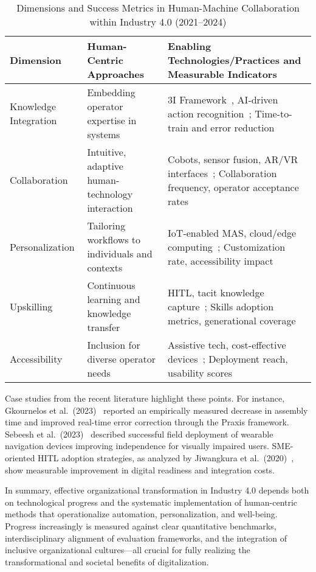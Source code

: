 \documentclass[sigconf]{acmart}
\begin{document}
\begin{table*}[htbp]
\centering
\caption{Dimensions and Success Metrics in Human-Machine Collaboration within Industry 4.0 (2021--2024)}
\label{tab:collab_factors}
\begin{adjustbox}{max width=\textwidth}
\begin{tabular}{lll}
\toprule
\textbf{Dimension} & \textbf{Human-Centric Approaches} & \textbf{Enabling Technologies/Practices and Measurable Indicators} \\
\midrule
Knowledge Integration & Embedding operator expertise in systems & 3I Framework~\cite{ref17}, AI-driven action recognition~\cite{ref46}; Time-to-train and error reduction \\
Collaboration & Intuitive, adaptive human-technology interaction & Cobots, sensor fusion, AR/VR interfaces~\cite{ref17,ref29}; Collaboration frequency, operator acceptance rates \\
Personalization & Tailoring workflows to individuals and contexts & IoT-enabled MAS, cloud/edge computing~\cite{ref54,ref45}; Customization rate, accessibility impact \\
Upskilling & Continuous learning and knowledge transfer & HITL, tacit knowledge capture~\cite{ref17,ref90}; Skills adoption metrics, generational coverage \\
Accessibility & Inclusion for diverse operator needs & Assistive tech, cost-effective devices~\cite{ref65}; Deployment reach, usability scores \\
\bottomrule
\end{tabular}
\end{adjustbox}
\end{table*}

Case studies from the recent literature highlight these points. For instance, Gkournelos et al.\ (2023)~\cite{ref46} reported an empirically measured decrease in assembly time and improved real-time error correction through the Praxis framework. Sebeesh et al.\ (2023)~\cite{ref65} described successful field deployment of wearable navigation devices improving independence for visually impaired users. SME-oriented HITL adoption strategies, as analyzed by Jiwangkura et al.\ (2020)~\cite{ref89}, show measurable improvement in digital readiness and integration costs.

In summary, effective organizational transformation in Industry 4.0 depends both on technological progress and the systematic implementation of human-centric methods that operationalize automation, personalization, and well-being. Progress increasingly is measured against clear quantitative benchmarks, interdisciplinary alignment of evaluation frameworks, and the integration of inclusive organizational cultures---all crucial for fully realizing the transformational and societal benefits of digitalization.
\end{document}
